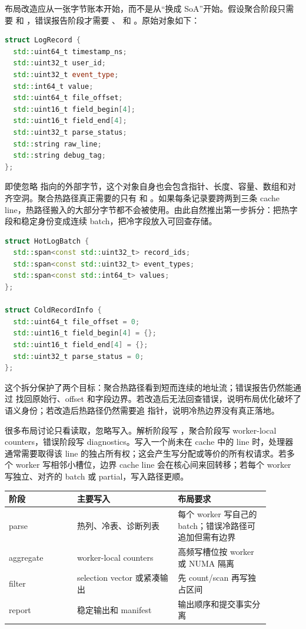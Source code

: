 布局改造应从一张字节账本开始，而不是从“换成 SoA”开始。假设聚合阶段只需要  和 ，错误报告阶段才需要 、 和 。原始对象如下：

\begin{lstlisting}[language=C++,caption={膨胀后的 LogRecord 形态}]
struct LogRecord {
  std::uint64_t timestamp_ns;
  std::uint32_t user_id;
  std::uint32_t event_type;
  std::int64_t value;
  std::uint64_t file_offset;
  std::uint16_t field_begin[4];
  std::uint16_t field_end[4];
  std::uint32_t parse_status;
  std::string raw_line;
  std::string debug_tag;
};
\end{lstlisting}

即使忽略  指向的外部字节，这个对象自身也会包含指针、长度、容量、数组和对齐空洞。聚合热路径真正需要的只有  和 。如果每条记录要跨两到三条 cache line，热路径搬入的大部分字节都不会被使用。由此自然推出第一步拆分：把热字段和稳定身份变成连续 batch，把冷字段放入可回查存储。

\begin{lstlisting}[language=C++,caption={从胖对象拆出的热 batch 和冷表}]
struct HotLogBatch {
  std::span<const std::uint32_t> record_ids;
  std::span<const std::uint32_t> event_types;
  std::span<const std::int64_t> values;
};

struct ColdRecordInfo {
  std::uint64_t file_offset = 0;
  std::uint16_t field_begin[4] = {};
  std::uint16_t field_end[4] = {};
  std::uint32_t parse_status = 0;
};
\end{lstlisting}

这个拆分保护了两个目标：聚合热路径看到短而连续的地址流；错误报告仍然能通过  找回原始行、offset 和字段边界。若改造后无法回查错误，说明布局优化破坏了语义身份；若改造后热路径仍然需要追  指针，说明冷热边界没有真正落地。

很多布局讨论只看读取，忽略写入。解析阶段写 ，聚合阶段写 worker-local counters，错误阶段写 diagnostics。写入一个尚未在 cache 中的 line 时，处理器通常需要取得该 line 的独占所有权；这会产生写分配或等价的所有权请求。若多个 worker 写相邻小槽位，边界 cache line 会在核心间来回转移；若每个 worker 写独立、对齐的 batch 或 partial，写入路径更顺。

\begin{center}
\begin{tabular}{p{0.23\linewidth}p{0.34\linewidth}p{0.31\linewidth}}
\toprule
阶段 & 主要写入 & 布局要求 \\
\midrule
parse & 热列、冷表、诊断列表 & 每个 worker 写自己的 batch；错误冷路径可追加但需有边界 \\
aggregate & worker-local counters & 高频写槽位按 worker 或 NUMA 隔离 \\
filter & selection vector 或紧凑输出 & 先 count/scan 再写独占区间 \\
report & 稳定输出和 manifest & 输出顺序和提交事实分离 \\
\bottomrule
\end{tabular}
\end{center}

